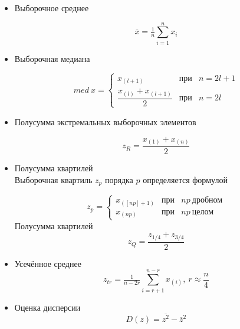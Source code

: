\documentclass[12pt,a4paper]{article}
\begin{document}
	\begin{itemize}
	\item Выборочное среднее

	\begin{equation}
		\overline{x} = \tfrac{1}{n}\sum_{i = 1}^{n}x_i
	\end{equation}

	\item Выборочная медиана

	\begin{equation}
	med\ x = \left\{
	\begin{array}{ccl}
	x_{(l + 1)} & \text{при} & n = 2l + 1\\
	\dfrac{x_{(l)} + x_{(l + 1)}}{2} & \text{при} & n = 2l
	\end{array}
	\right.
	\end{equation}

	\item Полусумма экстремальных выборочных элементов

	\begin{equation}
		z_{R} = \frac{x_{(1)} + x_{(n)}}{2}
	\end{equation}

	\item Полусумма квартилей \\
	Выборочная квартиль $z_{p}$ порядка $p$ определяется формулой

	\begin{equation}
		z_{p} = \left\{
		\begin{array}{ccl}
		x_{([np]+ 1)} & \text{при} & np\ \text{дробном}\\
		x_{(np)} & \text{при} & np\ \text{целом}
		\end{array}
		\right.
	\end{equation}
	Полусумма квартилей\\
	\begin{equation}
	z_{Q} = \dfrac{z_{1/4} + z_{3/4}}{2}
	\end{equation}
	\item Усечённое среднее
	\begin{equation}
	z_{tr} = \tfrac{1}{n - 2r}\sum_{i = r + 1}^{n - r}x_{(i)},\ r\approx\dfrac{n}{4}
	\end{equation}
	\item Оценка дисперсии
	\begin{equation}
	D(z) = \overline{z^2} - \overline{z}^2
	\end{equation}
	\end{itemize}
\end{document}
